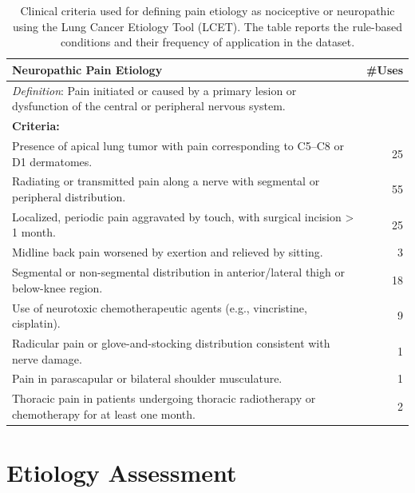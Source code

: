 \documentclass[preprint,12pt,authoryear]{elsarticle}
\begin{document}
\begin{table}[t!]
{\begin{tabular}{@{}p{18cm}r@{}}
\textbf{Neuropathic Pain Etiology} & \textbf{\#Uses} \\
\midrule
\textit{Definition}: Pain initiated or caused by a primary lesion or dysfunction of the central or peripheral nervous system. & \\
\textbf{Criteria:} & \\
Presence of apical lung tumor with pain corresponding to C5–C8 or D1 dermatomes. & 25 \\
Radiating or transmitted pain along a nerve with segmental or peripheral distribution. & 55 \\
Localized, periodic pain aggravated by touch, with surgical incision > 1 month. & 25 \\
Midline back pain worsened by exertion and relieved by sitting. & 3 \\
Segmental or non-segmental distribution in anterior/lateral thigh or below-knee region. & 18 \\
Use of neurotoxic chemotherapeutic agents (e.g., vincristine, cisplatin). & 9 \\
Radicular pain or glove-and-stocking distribution consistent with nerve damage. & 1 \\
Pain in parascapular or bilateral shoulder musculature. & 1 \\
Thoracic pain in patients undergoing thoracic radiotherapy or chemotherapy for at least one month. & 2 \\
\bottomrule
\end{tabular}}
\caption{Clinical criteria used for defining pain etiology as nociceptive or neuropathic using the Lung Cancer Etiology Tool (LCET). The table reports the rule-based conditions and their frequency of application in the dataset.\label{tab:lcet_criteria}}
\end{table}


\section{Etiology Assessment \label{sec:app_etiologiogy}}
\end{document}
